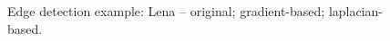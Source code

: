 \documentclass[12pt]{amsart}
\begin{document}
\begin{figure}
\endminipage\hfill
{}
\endminipage
\caption{Edge detection example: Lena -- original; gradient-based; laplacian-based.}\label{fig:lena}
\end{figure}
\end{document}
